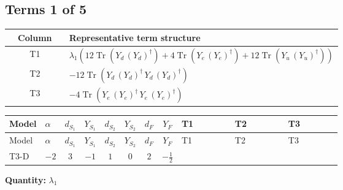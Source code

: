 \documentclass[8pt]{article}
\begin{document}
\begin{landscape}
\subsection*{Terms 1 of 5}
\begin{center}
\begin{tabular}{@{}c >{\raggedright\arraybackslash}p{0.82\linewidth}@{}}
\toprule
Column & Representative term structure \\
\midrule
T1 & \(\displaystyle {\lambda_1} (12 \operatorname{Tr}\!\left({Y_d}\,\left({Y_d}\right)^{\dagger}\right)+4 \operatorname{Tr}\!\left({Y_e}\,\left({Y_e}\right)^{\dagger}\right)+12 \operatorname{Tr}\!\left({Y_u}\,\left({Y_u}\right)^{\dagger}\right))\) \\
\midrule
T2 & \(\displaystyle -12 \operatorname{Tr}\!\left({Y_d}\,\left({Y_d}\right)^{\dagger}\,{Y_d}\,\left({Y_d}\right)^{\dagger}\right)\) \\
\midrule
T3 & \(\displaystyle -4 \operatorname{Tr}\!\left({Y_e}\,\left({Y_e}\right)^{\dagger}\,{Y_e}\,\left({Y_e}\right)^{\dagger}\right)\) \\
\midrule
\bottomrule
\end{tabular}
\end{center}
\smallskip
\tiny
\begin{longtable}{@{}llcccccc >{\raggedright\arraybackslash}p{0.21\linewidth} >{\raggedright\arraybackslash}p{0.21\linewidth} >{\raggedright\arraybackslash}p{0.21\linewidth}@{}}
\toprule
Model & $\alpha$ & $d_{S_1}$ & $Y_{S_1}$ & $d_{S_2}$ & $Y_{S_2}$ & $d_F$ & $Y_F$ & T1 & T2 & T3 \\
\midrule
\endfirsthead
\toprule
Model & $\alpha$ & $d_{S_1}$ & $Y_{S_1}$ & $d_{S_2}$ & $Y_{S_2}$ & $d_F$ & $Y_F$ & T1 & T2 & T3 \\
\midrule
\endhead
T3-D & $-2$ & $3$ & $-1$ & $1$ & $0$ & $2$ & $-\frac{1}{2}$ & \scriptsize\adjustbox{max width=\linewidth}{$\begin{gathered} {\lambda_1} (12 \operatorname{Tr}\!\left({Y_d}\,\left({Y_d}\right)^{\dagger}\right)+4 \operatorname{Tr}\!\left({Y_e}\,\left({Y_e}\right)^{\dagger}\right)+12 \operatorname{Tr}\!\left({Y_u}\,\left({Y_u}\right)^{\dagger}\right))\end{gathered}$} & \scriptsize\adjustbox{max width=\linewidth}{$\begin{gathered} -12 \operatorname{Tr}\!\left({Y_d}\,\left({Y_d}\right)^{\dagger}\,{Y_d}\,\left({Y_d}\right)^{\dagger}\right)\end{gathered}$} & \scriptsize\adjustbox{max width=\linewidth}{$\begin{gathered} -4 \operatorname{Tr}\!\left({Y_e}\,\left({Y_e}\right)^{\dagger}\,{Y_e}\,\left({Y_e}\right)^{\dagger}\right)\end{gathered}$} \\
\midrule
\bottomrule
\end{longtable}
\clearpage
\noindent\textbf{Quantity: }$\lambda_1$\par\smallskip

\end{landscape}
\end{document}
